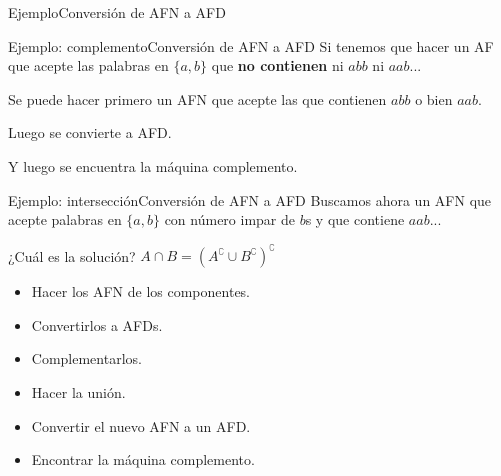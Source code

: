 \documentclass[spanish,handout]{beamer}
\begin{document}
  \begin{frame}{Ejemplo}{Conversión de AFN a AFD}
    \begin{center}
    \end{center}      
  \end{frame}

  \begin{frame}{Ejemplo: complemento}{Conversión de AFN a AFD}
      Si tenemos que hacer un AF que acepte las palabras en $\{a,b\}$ que \textbf{no contienen} ni $abb$ ni $aab$... \pause

      \bigskip

      Se puede hacer primero un AFN que acepte las que contienen $abb$ o bien $aab$. \pause

      \bigskip

      Luego se convierte a AFD. \pause

      \bigskip

      Y luego se encuentra la máquina complemento.
  \end{frame}

  \begin{frame}{Ejemplo: intersección}{Conversión de AFN a AFD}
      Buscamos ahora un AFN que acepte palabras en $\{a,b\}$ con número impar de $b$s y que contiene $aab$... \pause
      
      \bigskip

      ¿Cuál es la solución? \pause $A \cap B = (A^\complement \cup B^\complement)^\complement$ \pause

      \bigskip

      \begin{itemize}
          \item Hacer los AFN de los componentes. \pause
          \item Convertirlos a AFDs. \pause
          \item Complementarlos. \pause
          \item Hacer la unión. \pause
          \item Convertir el nuevo AFN a un AFD. \pause
          \item Encontrar la máquina complemento.
      \end{itemize}
  \end{frame}
  
  
  
    
  
  
\end{document}
